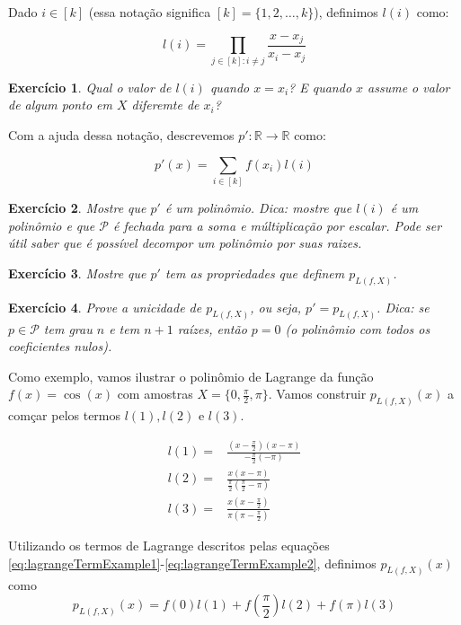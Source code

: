 \documentclass[]{article}
\newtheorem{exercicio}{Exercício}
\numberwithin{equation}{section}
\begin{document}
Dado $i \in [k]$ (essa notação significa $[k] = \{1, 2, \dots, k\}$),
definimos $l(i)$ como:

$$
l(i) = \prod_{j \in [k] : i \neq j} \frac{x - x_j}{x_i - x_j}
$$

\begin{exercicio}
  Qual o valor de $l(i)$ quando $x = x_i$? E quando $x$ assume o valor
  de algum ponto em $X$ diferemte de $x_i$?
\end{exercicio}

Com a ajuda dessa notação, descrevemos
$p' : \mathbb{R} \to \mathbb{R}$ como:

$$
p'(x) = \sum_{i \in [k]} f(x_i)l(i)
$$

\begin{exercicio}
  Mostre que $p'$ é um polinômio. Dica: mostre que $l(i)$ é um
  polinômio e que $\mathcal{P}$ é fechada para a soma e múltiplicação
  por escalar. Pode ser útil saber que é possível decompor um
  polinômio por suas raizes.
\end{exercicio}

\begin{exercicio}
  Mostre que $p'$ tem as propriedades que definem $p_{L(f, X)}$.
\end{exercicio}

\begin{exercicio}
  Prove a unicidade de $p_{L(f, X)}$, ou seja, $p' = p_{L(f,
    X)}$. Dica: se $p \in \mathcal{P}$ tem grau $n$ e tem $n + 1$
  raízes, então $p = 0$ (o polinômio com todos os coeficientes nulos).
\end{exercicio}

Como exemplo, vamos ilustrar o polinômio de Lagrange da função
$f(x) = \cos(x)$ com amostras $X = \{0, \frac{\pi}{2}, \pi\}$.  Vamos
construir $p_{L(f, X)}(x)$ a comçar pelos termos $l(1), l(2)$ e
$l(3)$.

\begin{align}
  l(1) =& \frac{(x - \frac{\pi}{2})(x - \pi)}{-\frac{\pi}{2}(-\pi)} \label{eq:lagrangeTermExample1} \\
  l(2) =& \frac{x(x - \pi)}{\frac{\pi}{2}(\frac{\pi}{2} - \pi)} \\
  l(3) =& \frac{x(x - \frac{\pi}{2})}{\pi(\pi - \frac{\pi}{2})} \label{eq:lagrangeTermExample2} 
\end{align}

Utilizando os termos de Lagrange descritos pelas equações
\eqref{eq:lagrangeTermExample1}-\eqref{eq:lagrangeTermExample2},
definimos $p_{L(f, X)}(x)$ como
$$
p_{L(f, X)}(x) = f(0)l(1) + f\left(\frac{\pi}{2}\right)l(2) + f(\pi)l(3)
$$
\end{document}
